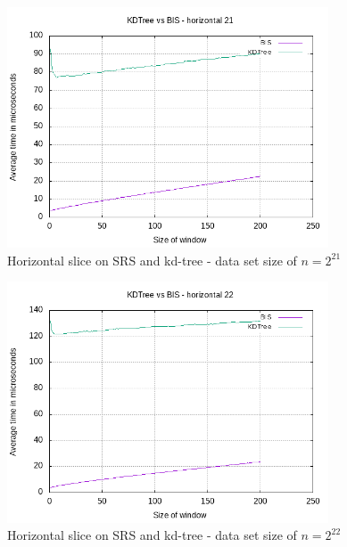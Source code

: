 \begin{figure}[h]
    \centering
    \includegraphics[width = 0.85\textwidth]{pictures/analysis/smalls/hori_21.png}
    \caption{Horizontal slice on SRS and kd-tree - data set size of $n=2^{21}$}\label{fig:small_hori_21}
\end{figure}

\begin{figure}[h]
    \centering
    \includegraphics[width = 0.85\textwidth]{pictures/analysis/smalls/hori_22.png}
    \caption{Horizontal slice on SRS and kd-tree - data set size of $n=2^{22}$}\label{fig:small_hori_22}
\end{figure}

